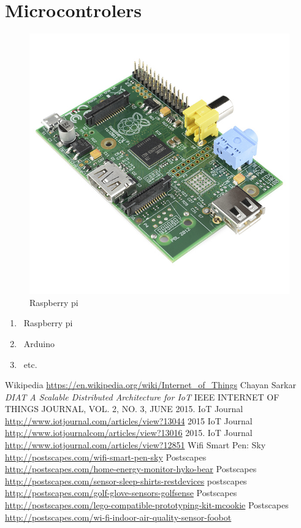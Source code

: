 \documentclass[12pt]{article}
\begin{document}
\section {Microcontrolers}
\begin{figure}
\caption[width=50mm] {Raspberry pi}
\includegraphics{pi}
\end{figure}

\begin{enumerate}
\item\ Raspberry pi
\item\ Arduino
\item\ etc.
\end{enumerate}

 
 
 \begin{thebibliography}{1}
  Wikipedia \url{https://en.wikipedia.org/wiki/Internet_of_Things}
  Chayan Sarkar \emph{DIAT A Scalable Distributed Architecture for IoT} IEEE INTERNET OF THINGS JOURNAL, VOL. 2, NO. 3, JUNE 2015.
  IoT Journal \url{http://www.iotjournal.com/articles/view?13044} 2015
  IoT Journal \url{http://www.iotjournalcom/articles/view?13016} 2015.
  IoT Journal \url{http://www.iotjournal.com/articles/view?12851} 
  Wifi Smart Pen: Sky \url{http://postscapes.com/wifi-smart-pen-sky} 
  Postscapes \url{http://postscapes.com/home-energy-monitor-hyko-bear}
  Postscapes \url{http://postscapes.com/sensor-sleep-shirts-restdevices}
  postscapes \url{http://postscapes.com/golf-glove-sensors-golfsense}
  Postscapes \url{http://postscapes.com/lego-compatible-prototyping-kit-mcookie}
  Postscapes \url{http://postscapes.com/wi-fi-indoor-air-quality-sensor-foobot}

 \end{thebibliography}
\end{document}
